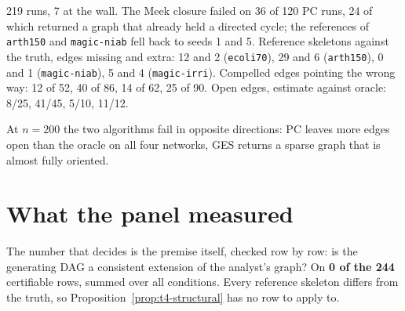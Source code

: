 \begin{medido}
219 runs, 7 at the wall. The Meek closure failed on 36 of 120 PC runs, 24 of which returned a graph
that already held a directed cycle; the references of \texttt{arth150} and \texttt{magic-niab} fell
back to seeds 1 and 5. Reference skeletons against the truth, edges missing and extra: 12 and 2
(\texttt{ecoli70}), 29 and 6 (\texttt{arth150}), 0 and 1 (\texttt{magic-niab}), 5 and 4
(\texttt{magic-irri}). Compelled edges pointing the wrong way: 12 of 52, 40 of 86, 14 of 62, 25 of 90.
Open edges, estimate against oracle: 8/25, 41/45, 5/10, 11/12.
\end{medido}

At $n = 200$ the two algorithms fail in opposite directions: PC leaves more edges open than the oracle
on all four networks, GES returns a sparse graph that is almost fully oriented.


\begin{antes}
\end{antes}

\section{What the panel measured}\label{sec:pest-measured}

The number that decides is the premise itself, checked row by row: is the generating DAG a consistent
extension of the analyst's graph? On \textbf{0 of the 244} certifiable rows, summed over all
conditions. Every reference skeleton differs from the truth, so Proposition~\ref{prop:t4-structural}
has no row to apply to.

